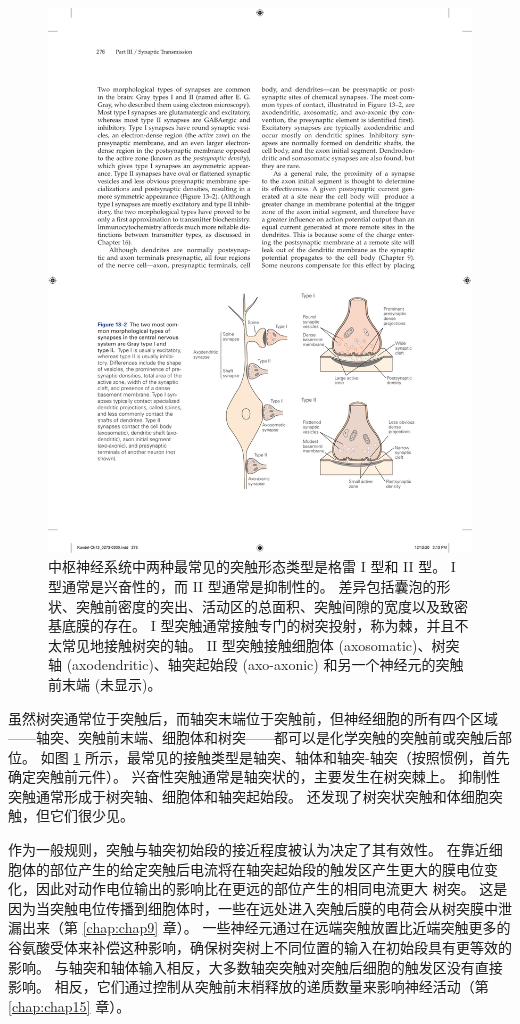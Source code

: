\begin{figure}[htbp]
	\centering
	\includegraphics[width=0.7\linewidth]{chap13/fig_13_2}
	\caption{中枢神经系统中两种最常见的突触形态类型是格雷 I 型和 II 型。 I 型通常是兴奋性的，而 II 型通常是抑制性的。 差异包括囊泡的形状、突触前密度的突出、活动区的总面积、突触间隙的宽度以及致密基底膜的存在。 I 型突触通常接触专门的树突投射，称为棘，并且不太常见地接触树突的轴。 II 型突触接触细胞体 (axosomatic)、树突轴 (axodendritic)、轴突起始段 (axo-axonic) 和另一个神经元的突触前末端 (未显示)。}
	\label{fig:13_2}
\end{figure}


虽然树突通常位于突触后，而轴突末端位于突触前，但神经细胞的所有四个区域——轴突、突触前末端、细胞体和树突——都可以是化学突触的突触前或突触后部位。 
如图 \ref{fig:13_2} 所示，最常见的接触类型是轴突、轴体和轴突-轴突（按照惯例，首先确定突触前元件）。 
兴奋性突触通常是轴突状的，主要发生在树突棘上。 
抑制性突触通常形成于树突轴、细胞体和轴突起始段。 
还发现了树突状突触和体细胞突触，但它们很少见。


作为一般规则，突触与轴突初始段的接近程度被认为决定了其有效性。 
在靠近细胞体的部位产生的给定突触后电流将在轴突起始段的触发区产生更大的膜电位变化，因此对动作电位输出的影响比在更远的部位产生的相同电流更大 树突。 
这是因为当突触电位传播到细胞体时，一些在远处进入突触后膜的电荷会从树突膜中泄漏出来（第 \ref{chap:chap9} 章）。 
一些神经元通过在远端突触放置比近端突触更多的谷氨酸受体来补偿这种影响，确保树突树上不同位置的输入在初始段具有更等效的影响。 
与轴突和轴体输入相反，大多数轴突突触对突触后细胞的触发区没有直接影响。 
相反，它们通过控制从突触前末梢释放的递质数量来影响神经活动（第 \ref{chap:chap15} 章）。



